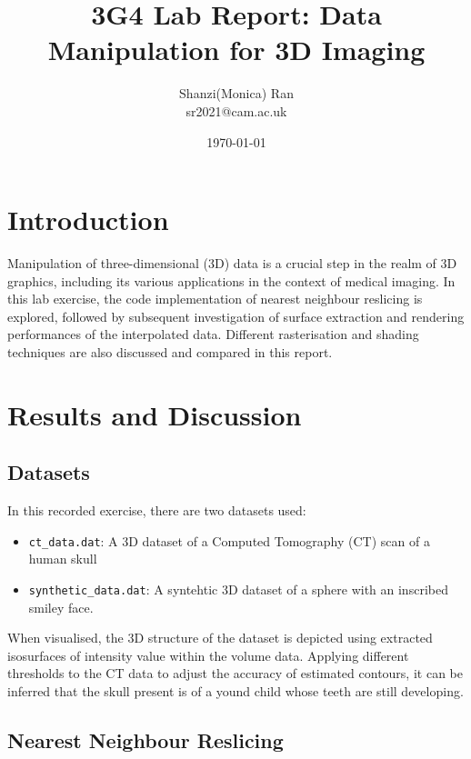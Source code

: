 \documentclass[11pt, twocolumn]{article}
\begin{document}
\singlespacing
\title{\Large \textbf{3G4 Lab Report: Data Manipulation for 3D Imaging}}
\author{Shanzi(Monica) Ran\\
sr2021@cam.ac.uk}
\date{\small \today}
\maketitle

\section{Introduction}
Manipulation of three-dimensional (3D) data is a crucial step in the realm of 3D graphics, including its various applications in the context of medical imaging. In this lab exercise, the code implementation of nearest neighbour reslicing is explored, followed by subsequent investigation of surface extraction and rendering performances of the interpolated data. Different rasterisation and shading techniques are also discussed and compared in this report.

\section{Results and Discussion}

\subsection{Datasets}

In this recorded exercise, there are two datasets used:
\vspace{-0.5em}
\begin{itemize}
    \item \texttt{ct\_data.dat}: A 3D dataset of a Computed Tomography (CT) scan of a human skull
    \item \texttt{synthetic\_data.dat}: A syntehtic 3D dataset of a sphere with an inscribed smiley face.
\end{itemize}
When visualised, the 3D structure of the dataset is depicted using extracted isosurfaces of intensity value within the volume data. Applying different thresholds to the CT data to adjust the accuracy of estimated contours, it can be inferred that the skull present is of a yound child whose teeth are still developing.

\subsection{Nearest Neighbour Reslicing}
\end{document}
